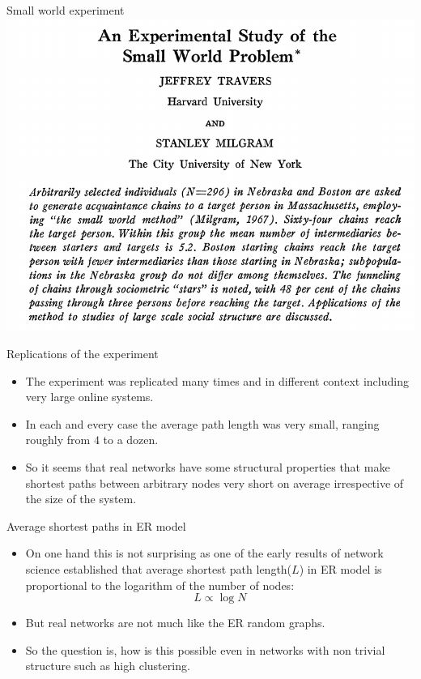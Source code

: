 \documentclass[
    hyperref={colorlinks,linkcolor=blue,urlcolor=blue,citecolor=blue}
]{beamer}
\begin{document}
\begin{frame}{Small world experiment}
\centering
\includegraphics[width=.9\textwidth]{small-world-experiment.png}
\end{frame}

\begin{frame}{Replications of the experiment}
\begin{itemize}
    \item The experiment was replicated many times and in different context
    including very large online systems.
    \item<2-> In each and every case the average path length was very small,
    ranging roughly from $4$ to a dozen.
    \item<3-> So it seems that real networks have some structural
    properties that make shortest paths between arbitrary nodes very
    short on average irrespective of the size of the system.
\end{itemize}
\end{frame}

\begin{frame}{Average shortest paths in ER model}
\begin{itemize}
    \item<2-> On one hand this is not surprising as one of the early results
    of network science established that average shortest path length($L$) in
    ER model is proportional to the logarithm of the number of nodes:
    \[
        L \propto \log{N}
    \]
    \item<3-> But real networks are not much like the ER random graphs.
    \item<4-> So the question is, how is this possible even in networks
    with non trivial structure such as high clustering.
\end{itemize}
\end{frame}
\end{document}
